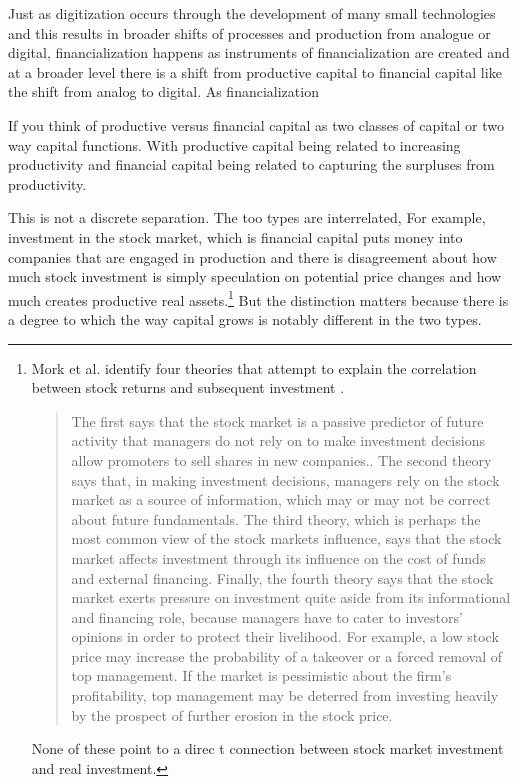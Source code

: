 Just as digitization occurs through the development of many small technologies and this results in %
broader shifts of processes and production from analogue or digital, financialization happens as instruments of financialization are created and at a broader level there is a shift from productive capital to financial capital like the shift from analog to digital. 
As financialization 

If you think of productive versus financial capital as two classes of capital or two way capital functions. With productive capital being related to increasing productivity and financial capital being related to capturing the surpluses from productivity. 

This is not a discrete separation. The too types are interrelated, For example, investment in the stock market, which is financial capital puts money into companies that are engaged in production and there is disagreement about how much stock investment is simply speculation on potential price changes and how much creates productive real assets.\footnote{Mork et al. identify four theories that attempt to explain the correlation between stock returns and subsequent investment \cite{morckStockMarketInvestment1990}. \begin{quotation}The first says that the stock market is a passive predictor of future activity that managers do not rely on to make investment decisions allow promoters to sell shares in new companies.. The second theory says that, in making investment decisions, managers rely on the stock market as a source of information, which may or may not be correct about future fundamentals. The third theory, which is perhaps the most common view of the stock markets influence, says that the stock market affects investment through its influence on the cost of funds and external financing. Finally, the fourth theory says that the stock market exerts pressure on investment quite aside from its informational and financing role, because managers have to cater to investors' opinions in order to protect their livelihood. For example, a low stock price may increase the probability of a takeover or a forced removal of top management. If the market is pessimistic about the firm's profitability, top management may be deterred from investing heavily by the prospect of further erosion in the stock price.\end{quotation} None of these point to a direc
t connection between stock market investment and real investment.}  But the distinction matters because there is a degree to which the way capital grows is notably different in the two types. 

